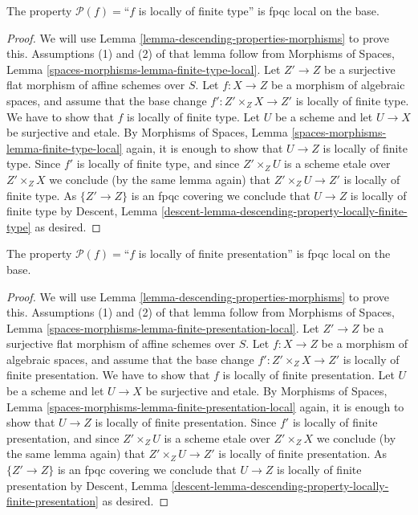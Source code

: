 \begin{lemma}
\label{lemma-descending-property-locally-finite-type}
The property $\mathcal{P}(f) =$``$f$ is locally of finite type''
is fpqc local on the base.
\end{lemma}

\begin{proof}
We will use
Lemma \ref{lemma-descending-properties-morphisms}
to prove this. Assumptions (1) and (2) of that lemma follow from
Morphisms of Spaces,
Lemma \ref{spaces-morphisms-lemma-finite-type-local}.
Let $Z' \to Z$ be a surjective flat morphism of affine schemes over $S$.
Let $f : X \to Z$ be a morphism of algebraic spaces, and assume
that the base change $f' : Z' \times_Z X \to Z'$ is locally of finite type.
We have to show that $f$ is locally of finite type. Let $U$ be a scheme
and let $U \to X$ be surjective and etale. By
Morphisms of Spaces,
Lemma \ref{spaces-morphisms-lemma-finite-type-local}
again, it is enough to show that $U \to Z$ is locally of finite type.
Since $f'$ is locally of finite type, and since $Z' \times_Z U$ is a
scheme etale over $Z' \times_Z X$ we conclude (by the same lemma again) that
$Z' \times_Z U \to Z'$ is locally of finite type.
As $\{Z' \to Z\}$ is an fpqc covering we conclude that
$U \to Z$ is locally of finite type by
Descent, Lemma \ref{descent-lemma-descending-property-locally-finite-type}
as desired.
\end{proof}

\begin{lemma}
\label{lemma-descending-property-locally-finite-presentation}
The property $\mathcal{P}(f) =$``$f$ is locally of finite presentation''
is fpqc local on the base.
\end{lemma}

\begin{proof}
We will use
Lemma \ref{lemma-descending-properties-morphisms}
to prove this. Assumptions (1) and (2) of that lemma follow from
Morphisms of Spaces,
Lemma \ref{spaces-morphisms-lemma-finite-presentation-local}.
Let $Z' \to Z$ be a surjective flat morphism of affine schemes over $S$.
Let $f : X \to Z$ be a morphism of algebraic spaces, and assume
that the base change $f' : Z' \times_Z X \to Z'$ is locally of
finite presentation.
We have to show that $f$ is locally of finite presentation. Let $U$ be a scheme
and let $U \to X$ be surjective and etale. By
Morphisms of Spaces,
Lemma \ref{spaces-morphisms-lemma-finite-presentation-local}
again, it is enough to show that $U \to Z$ is locally of finite presentation.
Since $f'$ is locally of finite presentation, and since $Z' \times_Z U$ is a
scheme etale over $Z' \times_Z X$ we conclude (by the same lemma again) that
$Z' \times_Z U \to Z'$ is locally of finite presentation.
As $\{Z' \to Z\}$ is an fpqc covering we conclude that
$U \to Z$ is locally of finite presentation by
Descent,
Lemma \ref{descent-lemma-descending-property-locally-finite-presentation}
as desired.
\end{proof}

